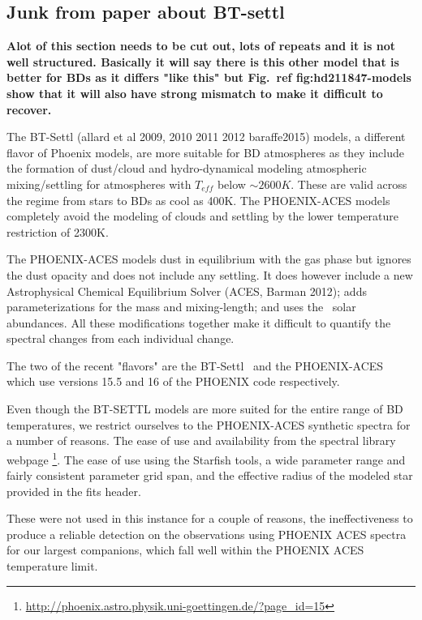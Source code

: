 \subsection{Junk from paper about BT-settl}


\textbf{Alot of this section needs to be cut out, lots of repeats and it is not well structured. Basically it will say there is this other model that is better for BDs as it differs "like this" but Fig.~\textbf{ref {fig:hd211847-models}} show that it will also have strong mismatch to make it difficult to recover.}

\label{bt-setll}
The BT-Settl (allard et al 2009, 2010 2011 2012 baraffe2015) models, a different flavor of Phoenix models, are more suitable for BD atmospheres as they  include the formation of dust/cloud and hydro-dynamical modeling atmospheric mixing/settling for atmospheres with \(T_{eff}\) below \(\sim2600K\). These are valid across the regime from stars to BDs as cool as 400K. The PHOENIX-ACES models completely avoid the modeling of clouds and settling by the lower temperature restriction of 2300K.

The PHOENIX-ACES models dust in equilibrium with the gas phase but ignores the dust opacity and does not include any settling. It does however include a new Astrophysical Chemical Equilibrium Solver (ACES,
Barman 2012); adds parameterizations for the mass and mixing-length; and uses the~\cite{asplund_chemical_2009} solar abundances. All these modifications together make it difficult to quantify the spectral changes from each individual change. 

The two of the recent "flavors" are the BT-Settl~\citep{allard_model_2010, baraffe_new_2015} and the PHOENIX-ACES~\citep{husser_new_2013} which use versions 15.5 and 16 of the PHOENIX code respectively.

Even though the BT-SETTL models are more suited for the entire range of BD temperatures, we restrict ourselves to the PHOENIX-ACES synthetic spectra for a number of reasons. The ease of use and availability from the spectral library webpage \footnote{\url{http://phoenix.astro.physik.uni-goettingen.de/?page_id=15}}. The ease of use using the Starfish tools, a wide parameter range and fairly consistent parameter grid span, and the effective radius of the modeled star provided in the fits header. 

These were not used in this instance for a couple of reasons, the ineffectiveness to produce a reliable detection on the observations using PHOENIX ACES spectra for our largest companions, which fall well within the PHOENIX ACES temperature limit. 

